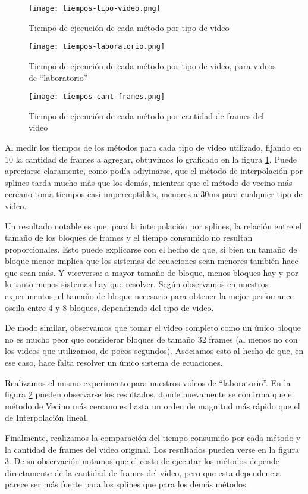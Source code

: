 \begin{figure}[h!]
  \centering
    \texttt{[image: tiempos-tipo-video.png]}
     \caption{Tiempo de ejecución de cada método por tipo de video}\label{fig:tiempos}
\end{figure}
\noindent


\begin{figure}[h!]
  \centering
    \texttt{[image: tiempos-laboratorio.png]}
     \caption{Tiempo de ejecución de cada método por tipo de video, para videos de ``laboratorio''}\label{fig:tiempos-lab}
\end{figure}
\noindent

\begin{figure}[h!]
  \centering
    \texttt{[image: tiempos-cant-frames.png]}
     \caption{Tiempo de ejecución de cada método por cantidad de frames del video}\label{fig:tiempos-cant-frames}
\end{figure}
\noindent


Al medir los tiempos de los métodos para cada tipo de video utilizado, fijando en 10 la cantidad de frames a agregar, obtuvimos lo graficado en la figura \ref{fig:tiempos}. Puede apreciarse claramente, como podía adivinarse, que el método de interpolación por splines tarda mucho más que los demás, mientras que el método de vecino más cercano toma tiempos casi imperceptibles, menores a 30ms para cualquier tipo de video.

Un resultado notable es que, para la interpolación por splines, la relación entre el tamaño de los bloques de frames y el tiempo consumido no resultan proporcionales. Esto puede explicarse con el hecho de que, si bien un tamaño de bloque menor implica que los sistemas de ecuaciones sean menores también hace que sean más. Y viceversa: a mayor tamaño de bloque, menos bloques hay y por lo tanto menos sistemas hay que resolver. Según observamos en nuestros experimentos, el tamaño de bloque necesario para obtener la mejor perfomance oscila entre 4 y 8 bloques, dependiendo del tipo de video.

De modo similar, observamos que tomar el video completo como un único bloque no es mucho peor que considerar bloques de tamaño 32 frames (al menos no con los videos que utilizamos, de pocos segundos). Asociamos esto al hecho de que, en ese caso, hace falta resolver un único sistema de ecuaciones.

Realizamos el mismo experimento para nuestros videos de ``laboratorio''. En la figura \ref{fig:tiempos-lab} pueden observarse los resultados, donde nuevamente se confirma que el método de Vecino más cercano es hasta un orden de magnitud más rápido que el de Interpolación lineal.

Finalmente, realizamos la comparación del tiempo consumido por cada método y la cantidad de frames del video original. Los resultados pueden verse en la figura \ref{fig:tiempos-cant-frames}. De su observación notamos que el costo de ejecutar los métodos depende directamente de la cantidad de frames del video, pero que esta dependencia parece ser más fuerte para los splines que para los demás métodos.